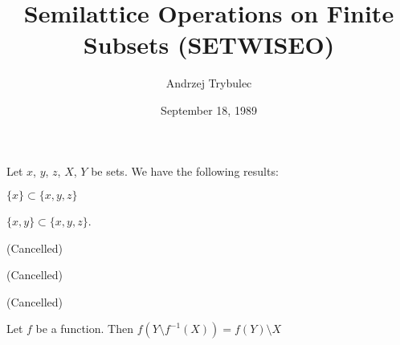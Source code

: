 \documentclass{article}
\title{Semilattice Operations on Finite Subsets (SETWISEO)}
\author{Andrzej Trybulec}
\date{September 18, 1989}
\begin{document}
\maketitle

Let $x$, $y$, $z$, $X$, $Y$ be sets. We have the following results:
\begin{thm}
\item\label{setwiseo:1} $\{x\}\subset\{x,y,z\}$
\item\label{setwiseo:2} $\{x,y\}\subset\{x,y,z\}$.
\item\label{setwiseo:3} (Cancelled)
\item\label{setwiseo:4} (Cancelled)
\item\label{setwiseo:5} (Cancelled)
\item\label{setwiseo:6} Let $f$ be a function. Then $f(Y\setminus f^{-1}(X))=f(Y)\setminus X$
\end{thm}
\end{document}
